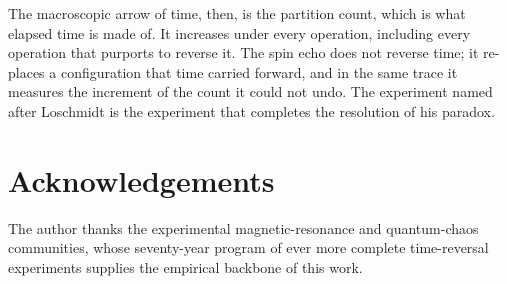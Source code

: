 \documentclass[11pt,a4paper]{article}
\theoremstyle{thmstyle}
\theoremstyle{definition}
\theoremstyle{remark}
\begin{document}
The macroscopic arrow of time, then, is the partition count, which is
what elapsed time is made of. It increases under every operation,
including every operation that purports to reverse it. The spin echo does
not reverse time; it re-places a configuration that time carried forward,
and in the same trace it measures the increment of the count it could not
undo. The experiment named after Loschmidt is the experiment that
completes the resolution of his paradox.

\section*{Acknowledgements}
The author thanks the experimental magnetic-resonance and quantum-chaos
communities, whose seventy-year program of ever more complete time-reversal
experiments supplies the empirical backbone of this work.



\end{document}
